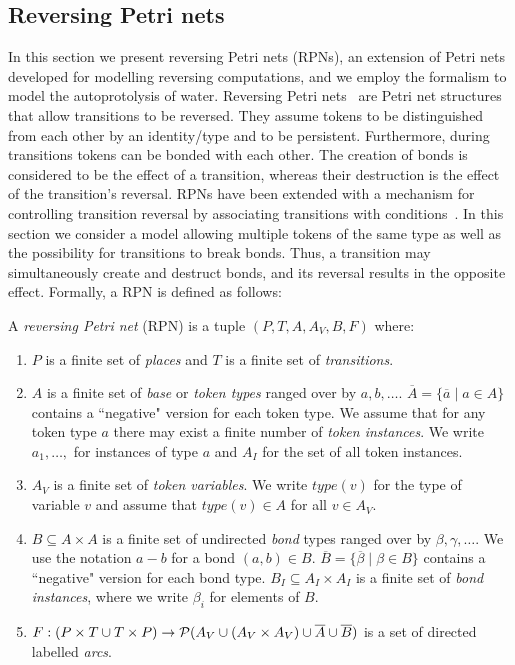 \documentclass[runningheads]{llncs}
\newcommand{\PN}{reversing Petri net }
\newcommand{\bond}{\!-\!}
\newcommand{\type}{\mathit{type}}
\begin{document}
\subsection{Reversing Petri nets}
In this section we present reversing Petri nets (RPNs), an extension of Petri nets
developed for modelling reversing computations, and we employ the formalism
to model the autoprotolysis of water. Reversing Petri nets~\cite{RPNs} are 
Petri net structures that allow transitions to be reversed. They assume 
tokens to be distinguished from each other by an identity/type and to be persistent. Furthermore,
during transitions tokens can be bonded with each other. The creation of bonds
is considered to be the effect of a transition, whereas their destruction is the effect of
the transition's reversal. RPNs
have been extended with a mechanism for controlling transition
reversal by associating transitions with conditions~\cite{RC19}. In this section we consider
a model allowing multiple tokens of the same type as well as the possibility for 
transitions to break bonds. Thus, a transition may simultaneously create
and destruct bonds, and its reversal results in the opposite effect. Formally, a RPN
is defined as follows:
\begin{definition}{\rm
		A \emph{\PN}(RPN) is a tuple $(P,T,  A, A_V, B, F)$ where:
		\begin{enumerate}
			\item $P$ is a finite set of \emph{places} and
			$T$ is a finite set of \emph{transitions}.
			\item $A$ is a finite set of \emph{base} or \emph{token types} ranged over by $a, b,\ldots$.
			$\overline{A} = 
			\{\overline{a}\mid a\in A\}$ contains a ``negative"  version for each token type. We assume that
			for any token type $a$ there may exist a finite number of \emph{token instances}. 
			We write $a_1,\ldots,$ for
			instances of type $a$ and $A_I$ for the set of all token instances. 
			\item $A_V$ is a finite set of \emph{token variables}. We write $\type(v)$ for the type
			of variable $v$ and assume that $\type(v) \in A$ for all $v\in A_V$.
			\item $B\subseteq A\times A$ is a finite set of undirected \emph{bond} types ranged over
			by $\beta,\gamma,\ldots$. We use the notation $a \bond b$ for a bond $(a,b)\in B$.  
			$\overline{B} = \{\overline{\beta}\mid \beta\in B\}$ contains a ``negative" version for 
			each bond type. $B_I\subseteq A_I\times A_I$ is a finite set of \emph{bond instances},
			where we write $\beta_i$ 
			for elements of $B$.
			\item $F : (P\times T  \cup T \times P)\rightarrow {\cal P}( A_V \cup (A_V \times A_V) \cup \overline{A}
			\cup \overline{B}) $ 
			is a set of directed labelled \emph{arcs}.
		\end{enumerate}
}\end{definition}
\end{document}
